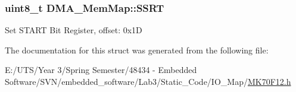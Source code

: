 \subsubsection[{S\+S\+R\+T}]{\setlength{\rightskip}{0pt plus 5cm}uint8\+\_\+t D\+M\+A\+\_\+\+Mem\+Map\+::\+S\+S\+R\+T}\label{struct_d_m_a___mem_map_a39ea12b8e20431f54f8c6ba9f08bfc1b}
Set S\+T\+A\+R\+T Bit Register, offset\+: 0x1\+D 

The documentation for this struct was generated from the following file\+:\begin{DoxyCompactItemize}
\item 
E\+:/\+U\+T\+S/\+Year 3/\+Spring Semester/48434 -\/ Embedded Software/\+S\+V\+N/embedded\+\_\+software/\+Lab3/\+Static\+\_\+\+Code/\+I\+O\+\_\+\+Map/\hyperlink{_m_k70_f12_8h}{M\+K70\+F12.\+h}\end{DoxyCompactItemize}
